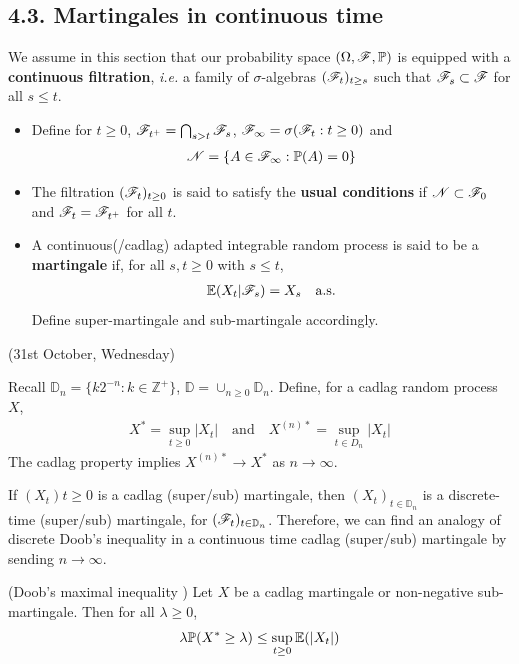 \documentclass[12pt,a4paper]{report}
\begin{document}
\subsection*{4.3. Martingales in continuous time}

We assume in this section that our probability space $(\Omega, \mathscr{F}, \mathbb{P})$ is equipped with a \textbf{continuous filtration}, \emph{i.e.} a family of $\sigma$-algebras $(\mathscr{F}_t)_{t\geq s}$ such that $\mathscr{F}_s \subset \mathscr{F}$ for all $s\leq t$.

\begin{itemize}
\item Define for $t\geq 0$, $\mathscr{F}_{t^+} = \bigcap_{s>t} \mathscr{F}_s$, $\mathscr{F}_{\infty}  = \sigma(\mathscr{F}_t : t\geq 0)$ and
\begin{align*}
\mathscr{N} = \{A\in \mathscr{F}_{\infty} : \mathbb{P}(A) =0 \}
\end{align*}
\item The filtration $(\mathscr{F}_t)_{t\geq 0}$ is said to satisfy the \textbf{usual conditions} if $\mathscr{N} \subset \mathscr{F}_{0}$ and $\mathscr{F}_t = \mathscr{F}_{t^+}$ for all $t$.
\item A continuous(/cadlag) adapted integrable random process is said to be a \textbf{martingale} if, for all $s,t\geq 0$ with $s\leq t$,
\begin{align*}
\mathbb{E}(X_t|\mathscr{F}_s) = X_s \quad \text{a.s.} 
\end{align*}
Define super-martingale and sub-martingale accordingly.
\end{itemize}
\s

\newday

(31st October, Wednesday)
\s

Recall $\mathbb{D}_n = \{k2^{-n} : k\in \mathbb{Z}^+ \}$, $\mathbb{D} = \cup_{n\geq 0}\mathbb{D}_n$. Define, for a cadlag random process $X$,
\begin{align*}
X^* = \sup_{t\geq 0}|X_t| \quad \text{and} \quad X^{(n)*} = \sup_{t\in D_n} |X_t|
\end{align*}
The cadlag property implies $X^{(n)*} \rightarrow X^*$ as $n\rightarrow \infty$.

\quad If $(X_t){t\geq 0}$ is a cadlag (super/sub) martingale, then $(X_t)_{t\in \mathbb{D}_n}$ is a discrete-time (super/sub) martingale, for $(\mathscr{F}_t)_{t\in \mathbb{D}_n}$. Therefore, we can find an analogy of discrete Doob's inequality in a continuous time cadlag (super/sub) martingale by sending $n\rightarrow \infty$.
\s

(Doob's maximal inequality ) Let $X$ be a cadlag martingale or non-negative sub-martingale. Then for all $\lambda \geq0$,
\begin{align*}
\lambda \mathbb{P} (X^* \geq \lambda) \leq \sup_{t\geq 0} \mathbb{E}(|X_t|)
\end{align*}
\s
\end{document}

